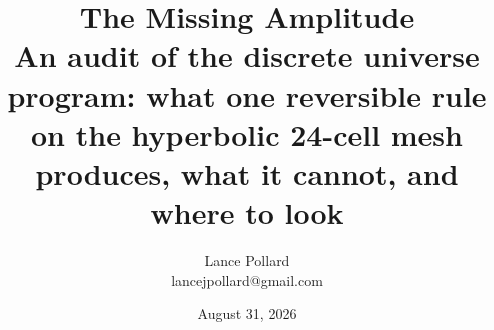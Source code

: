 \renewcommand{\thepart}{\arabic{part}}
\titleformat{\part}[hang]{\Large\bfseries}{\thepart.}{0.5em}{}
\titlespacing*{\part}{0pt}{1.2em}{0.8em}
\titleformat{\section}{\Large\bfseries}{}{0pt}{}

\onehalfspacing

\theoremheaderfont{\bfseries}
\theorembodyfont{\normalfont}
\newtheorem{axiom}{Axiom}
\newtheorem{definition}{Definition}
\newtheorem{theorem}{Theorem}
\newtheorem{principle}{Principle}
\newtheorem{result}{Result}
\newtheorem{finding}{Finding}

\makeatletter
\def\@begintheorem#1#2#3{%
  \par\addvspace{0.5em}%
  \noindent\textbf{#1 #2.}
  \ifx\@empty#3\relax
    \quad
  \else
    \ \textbf{#3:}
  \fi
  \hspace{0.5em}
}
\def\@endtheorem{\par}
\makeatother

\title{
  {\huge \textbf{The Missing Amplitude}} \\[3mm]
  \large An audit of the discrete universe program: what one reversible rule on the hyperbolic 24-cell mesh produces, what it cannot, and where to look
}
\author{Lance Pollard \\ \small lancejpollard@gmail.com}
\date{August 31, 2026}
